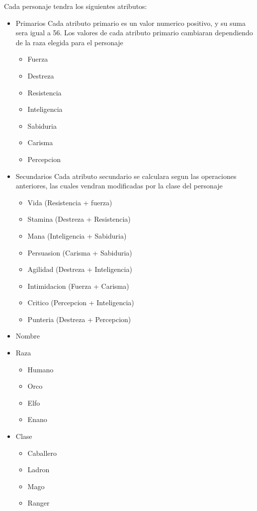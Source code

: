 \documentclass{article}
\begin{document}
Cada personaje tendra los siguientes atributos:
\begin{itemize}
\item Primarios
Cada atributo primario es un valor numerico positivo, y su suma sera igual a 56.
Los valores de cada atributo primario cambiaran dependiendo de la raza elegida para el personaje
	\begin{itemize}
		\item Fuerza
		\item Destreza
		\item Resistencia
		\item Inteligencia
		\item Sabiduria
		\item Carisma
		\item Percepcion
	\end{itemize}

\item Secundarios
Cada atributo secundario se calculara segun las operaciones anteriores, las cuales vendran modificadas por la clase
del personaje
	\begin{itemize}
		\item Vida		  	(Resistencia + fuerza)
		\item Stamina	  	(Destreza + Resistencia)
		\item Mana		  	(Inteligencia + Sabiduria)
		\item Persuasion   	(Carisma + Sabiduria)
		\item Agilidad	  	(Destreza + Inteligencia)
		\item Intimidacion 	(Fuerza + Carisma)
		\item Critico		(Percepcion + Inteligencia)
		\item Punteria		(Destreza + Percepcion)
	\end{itemize}

\item Nombre
\item Raza
	\begin{itemize}
		\item Humano
		\item Orco
		\item Elfo
		\item Enano
	\end{itemize}
\item Clase
	\begin{itemize}
		\item Caballero
		\item Ladron
		\item Mago
		\item Ranger
	\end{itemize}



\end{itemize}
\end{document}
